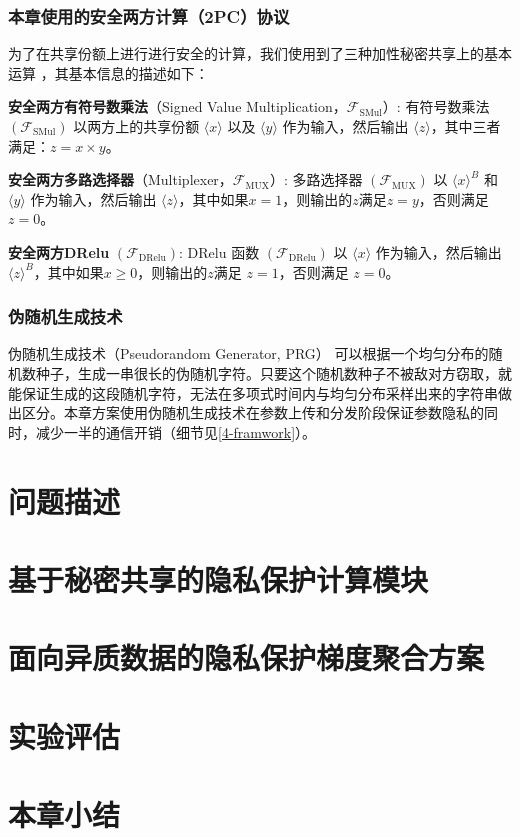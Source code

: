\subsubsection{本章使用的安全两方计算（2PC）协议}
为了在共享份额上进行进行安全的计算，我们使用到了三种加性秘密共享上的基本运算 \cite{rathee2021sirnn}，其基本信息的描述如下：
\begin{compactitem}
    \item \textbf{安全两方有符号数乘法}（Signed Value Multiplication，$\mathcal{F}_{\text{SMul}}$）: 有符号数乘法 $(\mathcal{F}_{\text{SMul}})$ 以两方上的共享份额 $\langle x\rangle$ 以及 $\langle y\rangle$ 作为输入，然后输出 $\langle z\rangle$，其中三者满足：$z = x \times y$。
    \item \textbf{安全两方多路选择器}（Multiplexer，$\mathcal{F}_{\text{MUX}}$）: 多路选择器 $(\mathcal{F}_{\text{MUX}})$ 以 $\langle x\rangle^B$ 和 $\langle y\rangle$ 作为输入，然后输出 $\langle z\rangle$，其中如果$x = 1$，则输出的$z$满足$z = y$，否则满足$z = 0$。 
    \item \textbf{安全两方DRelu} $(\mathcal{F}_{\text{DRelu}})$: DRelu 函数 $(\mathcal{F}_{\text{DRelu}})$ 以 $\langle x\rangle$ 作为输入，然后输出 $\langle z\rangle^B$，其中如果$x \geq 0$，则输出的$z$满足 $z = 1$，否则满足 $z = 0$。
\end{compactitem}

\subsubsection{伪随机生成技术}
伪随机生成技术（Pseudorandom Generator, PRG）\cite{yao1982theory} 可以根据一个均匀分布的随机数种子，生成一串很长的伪随机字符。只要这个随机数种子不被敌对方窃取，就能保证生成的这段随机字符，无法在多项式时间内与均匀分布采样出来的字符串做出区分。本章方案使用伪随机生成技术在参数上传和分发阶段保证参数隐私的同时，减少一半的通信开销（细节见\ref{4-framwork}）。

\section{问题描述}\label{4-problem}

\section{基于秘密共享的隐私保护计算模块}\label{4-building}

\section{面向异质数据的隐私保护梯度聚合方案}\label{4-framework}

\section{实验评估}\label{4-exp}

\section{本章小结}\label{4-conclusion}